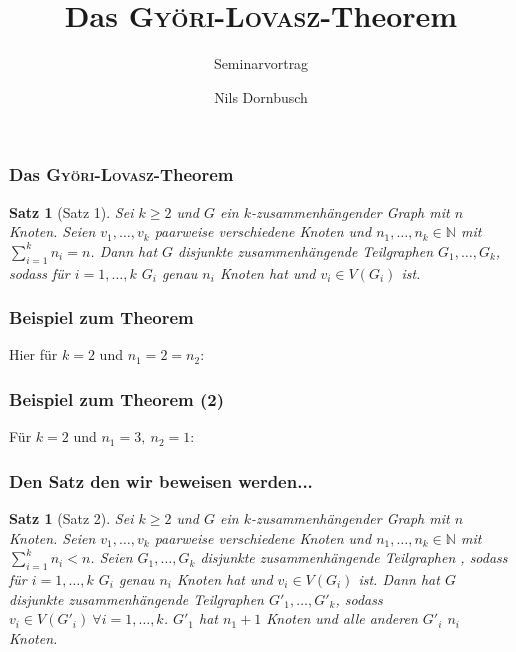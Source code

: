 \documentclass{beamer}
\title{Das \textsc{Györi-Lovasz}-Theorem}
\author{Nils Dornbusch}%
\subtitle{Seminarvortrag}
\institute{ }
\newcommand{\nn}{\mathbb{N}}
\theoremstyle{definition}
\theoremstyle{plain}
\newtheorem{sa}[auf]{Satz}
\begin{document}
\begin{frame}
  \titlepage
\end{frame}

\begin{frame}
\frametitle{Das \textsc{Györi-Lovasz}-Theorem}
\begin{sa}[Satz 1]
Sei $k\ge 2$ und $G$ ein $k$-zusammenhängender Graph mit $n$ Knoten. Seien $v_1,\dotsc,v_k$ paarweise verschiedene Knoten und $n_1,\dotsc,n_k\in\nn$ mit $\sum_{i=1}^kn_i=n$. Dann hat $G$ disjunkte zusammenhängende Teilgraphen $G_1,\dotsc,G_k$, sodass für $i=1,\dotsc,k$ $G_i$ genau $n_i$ Knoten hat und $v_i\in V(G_i)$ ist.
\end{sa}
\end{frame}
\begin{frame}
\frametitle{Beispiel zum Theorem}
Hier für $k=2$ und $n_1=2=n_2$:
\begin{figure}
\end{figure}
\end{frame}
\begin{frame}
\frametitle{Beispiel zum Theorem (2)}
Für $k=2$ und $n_1=3,~n_2=1$:
\begin{figure}
\end{figure}
\end{frame}
\begin{frame}
\frametitle{Den Satz den wir beweisen werden...}
\begin{sa}[Satz 2]
Sei $k\ge 2$ und $G$ ein $k$-zusammenhängender Graph mit $n$ Knoten. Seien $v_1,\dotsc,v_k$ paarweise verschiedene Knoten und $n_1,\dotsc,n_k\in\nn$ mit $\sum_{i=1}^kn_i<n$. Seien $G_1,\dotsc,G_k$ disjunkte zusammenhängende Teilgraphen , sodass für $i=1,\dotsc,k$ $G_i$ genau $n_i$ Knoten hat und $v_i\in V(G_i)$ ist. Dann hat $G$ disjunkte zusammenhängende Teilgraphen $G'_1,\dotsc,G'_k$, sodass $v_i\in V(G'_i)~\forall i=1,\dotsc,k$. $G'_1$ hat $n_1+1$ Knoten und alle anderen $G'_i$ $n_i$ Knoten.
\end{sa}
\end{frame}
\end{document}
